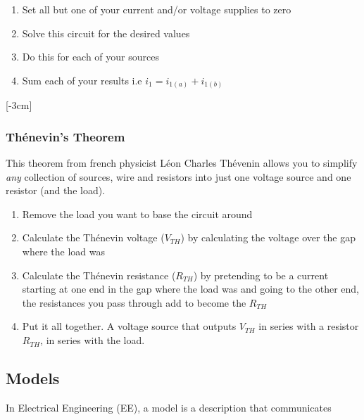 \documentclass[12pt]{article}
\begin{document}
\begin{enumerate}
  \item Set all but one of your current and/or voltage supplies to zero
  \item Solve this circuit for the desired values 
  \item Do this for each of your sources
  \item Sum each of your results i.e $i_1=i_{1(a)}+i_{1(b)}$
\end{enumerate}
[-3cm]

\begin{example}

\end{example}

\subsubsection{Th\'enevin's Theorem}
This theorem from french physicist Léon Charles Thévenin allows you to simplify \textit{any} collection of sources, wire and resistors into just one voltage source and one resistor (and the load).
\begin{enumerate}
  \item Remove the load you want to base the circuit around
  \item Calculate the Th\'enevin voltage ($V_{TH}$) by calculating the voltage over the gap where the load was
  \item Calculate the Th\'enevin resistance ($R_{TH}$) by pretending to be a current starting at one end in the gap where the load was and going to the other end, the resistances you pass through add to become the $R_{TH}$
  \item Put it all together. A voltage source that outputs $V_{TH}$ in series with a resistor $R_{TH}$, in series with the load.
\end{enumerate}

\begin{example}

\end{example}


\subsection{Models}
In Electrical Engineering (EE), a model is a description that communicates
\end{document}
